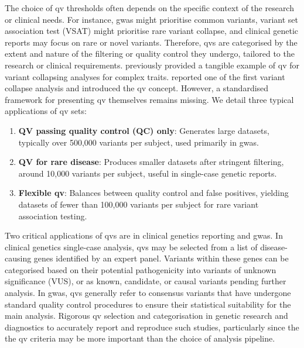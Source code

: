 The choice of \ac{qv} thresholds often depends on the specific context of the research or clinical needs. 
For instance, \ac{gwas} might prioritise common variants, 
variant set association test (VSAT) might prioritise rare variant collapse, 
and clinical genetic reports may focus on rare or novel variants. 
Therefore, \ac{qv}s are categorised by the extent and nature of the filtering or quality control they undergo, tailored to the research or clinical requirements. 
\citet{povysil2019rare} previously provided a tangible example of \ac{qv} for variant collapsing analyses for complex traits. 
\citet{cirulli2015exome} reported one of the first variant collapse analysis and introduced the \ac{qv} concept.
However, a standardised framework for presenting \ac{qv} themselves remains missing. 
We detail three typical applications of \ac{qv} sets:

\begin{enumerate}
    \item \textbf{QV passing quality control (QC) only}: Generates large datasets, typically over 500,000 variants per subject, used primarily in \ac{gwas}.
    \item \textbf{QV for rare disease}: Produces smaller datasets after stringent filtering, around 10,000 variants per subject, useful in single-case genetic reports.
    \item \textbf{Flexible \ac{qv}}: Balances between quality control and false positives, yielding datasets of fewer than 100,000 variants per subject for rare variant association testing.
\end{enumerate}

Two critical applications of  \ac{qv}s are in clinical genetics reporting and \ac{gwas}. 
In clinical genetics single-case analysis, \ac{qv}s may be selected from a list of disease-causing genes identified by an expert panel. 
Variants within these genes can be categorised based on their potential pathogenicity into variants of unknown significance (VUS), or as known, candidate, or causal variants pending further analysis. 
In \ac{gwas}, \ac{qv}s generally refer to consensus variants that have undergone standard quality control procedures to ensure their statistical suitability for the main analysis.
Rigorous \ac{qv} selection and categorisation in genetic research and diagnostics to accurately report and reproduce such studies, particularly since the the \ac{qv} criteria may be more important than the choice of analysis pipeline. 

